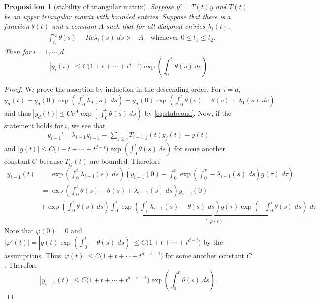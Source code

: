 \documentclass[a4paper,11pt]{article}
\newtheorem{proposition}{Proposition}[section]
\theoremstyle{remark}
\begin{document}
 \begin{proposition}[stability of triangular matrix]
 Suppose $y' = T(t) y$ and $T(t)$ be an upper triangular matrix with bounded entries. Suppose that there is a function $\theta(t)$ and a constant $A$ such that for all diagonal entries $\lambda_i(t)$,
 \begin{align} \label{eq:stabcond}
  &\int_{t_1}^{t_2} \theta(s)-Re\lambda_i(s)\; ds > -A \quad \text{whenever $0\le t_1 \le t_2$.}
 \end{align}
 Then for $i=1,\cdots,d$
 \begin{equation} \label{eq:triestim}
|y_{i}(t)| \le C\big( 1 + t + \cdots + t^{d-i}\big) \exp\left( \int_0^t \theta(s)\;ds\right)%
 \end{equation}
\end{proposition}
\begin{proof}
 We prove the assertion by induction in the descending order. For $i=d$, $y_d(t)=y_d(0)\exp\left( \int_0^t \lambda_d(s)\;ds\right)=y_d(0)\exp\left( \int_0^t \theta(s)-\theta(s)+\lambda_1(s)\;ds\right)$ and thus $|y_d(t)| \le Ce^A\exp\left( \int_0^t \theta(s)\;ds\right)$ by \eqref{eq:stabcond}. Now, if the statement holds for $i$, we see that
 \begin{align*}
  y_{i-1}' -\lambda_{i-1}y_{i-1} = \sum_{j\ge i} T_{i-1,j}(t)y_j(t) = g(t)
 \end{align*}
 and $|g(t)| \le C\big( 1 + t + \cdots + t^{d-i}\big) \exp\left( \int_0^t \theta(s)\;ds\right)$ for some another constant $C$ because $T_{ij}(t)$ are bounded. Therefore
 \begin{align*}
  y_{i-1}(t) &= \exp\left( \int_0^t \lambda_{i-1}(s)\;ds\right) \left(y_{i-1}(0) + \int_0^t \exp\left( \int_0^\tau -\lambda_{i-1}(s)\;ds\right)g(\tau) \; d\tau\right)\\
  &=\exp\left( \int_0^t \theta(s)-\theta(s)+\lambda_{i-1}(s)\;ds\right) y_{i-1}(0) \\
  &+ \exp\left( \int_0^t \theta(s)\;ds\right)\underbrace{\int_0^t \exp\left( \int_\tau^t \lambda_{i-1}(s)-\theta(s)\;ds\right)g(\tau)\exp\left( -\int_0^\tau \theta(s)\;ds\right) \; d\tau}_{\triangleq \varphi(t)}
  \end{align*}
 Note that $\varphi(0)=0$ and $|\varphi'(t)| = \left|g(t)\exp\left( \int_0^t -\theta(s)\;ds\right)\right|\le C\big( 1 + t + \cdots + t^{d-i}\big)$ by the assumptions. Thus $|\varphi(t)|\le C\big( 1 + t + \cdots + t^{d-i+1}\big)$ for some another constant $C$. Therefore
 $$|y_{i-1}(t)| \le C\big( 1 + t + \cdots + t^{d-i+1}\big)\exp\left( \int_0^t \theta(s)\;ds\right).$$
\end{proof}
\end{document}

